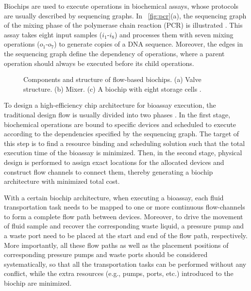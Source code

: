 Biochips are used to execute operations in biochemical assays, whose protocols
are usually described by sequencing graphs. In
\figname~\ref{fig:pcr}(a), the sequencing graph of
the mixing phase of the polymerase chain reaction
(PCR) is illustrated \cite{zhang2002microelectrofluidic}. This assay takes eight input samples ($i_1$-$i_8$) and processes them with seven mixing operations ($o_1$-$o_7$) to generate copies
of a DNA sequence. Moreover, the edges in the sequencing graph define the dependency of
operations, where a parent operation should always be executed before its child operations.

\begin{figure}[t]
{\figurefontsize
\centering

\caption{Components and structure of flow-based biochips. (a)
Valve structure. (b) Mixer. (c) A biochip with eight
storage cells \cite{AminTA09}.}
\label{fig:valve_mixer_storage}
}
\end{figure}

To design a high-efficiency chip architecture for bioassay execution, the traditional design flow is usually divided into two phases \cite{MinhassPMB12}. In the first stage, biochemical operations are bound to specific devices and scheduled to execute according to the dependencies specified by the sequencing graph. The target of this step is to find a resource binding and scheduling solution such that the total execution time of the bioassay is minimized. Then, in the second stage, physical design is performed to assign exact locations for the allocated devices and construct flow channels to connect them, thereby generating a biochip architecture with minimized total cost.

With a certain biochip architecture, when executing a bioassay, each fluid transportation task needs to be mapped to one or more continuous flow-channels to form a complete flow path between devices. Moreover, to drive the movement of fluid sample and recover the corresponding waste liquid, a pressure pump and a waste port need to be placed at the start and end of the flow path, respectively. More importantly, all these flow paths as well as the placement positions of corresponding pressure pumps and waste ports should be considered systematically, so that all the transportation tasks can be performed without any conflict, while the extra resources (e.g., pumps, ports, etc.) introduced to the biochip are minimized.

